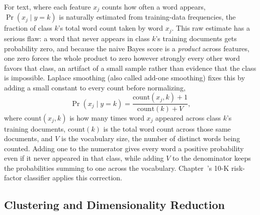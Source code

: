 \documentclass[../ai_in_finance]{subfiles}
\begin{document}
For text, where each feature $x_j$ counts how often a word appears, $\Pr(x_j \mid y=k)$ is naturally estimated from training-data frequencies, the fraction of class $k$'s total word count taken by word $x_j$. This raw estimate has a serious flaw: a word that never appears in class $k$'s training documents gets probability zero, and because the naive Bayes score is a \emph{product} across features, one zero forces the whole product to zero however strongly every other word favors that class, an artifact of a small sample rather than evidence that the class is impossible. Laplace smoothing (also called add-one smoothing) fixes this by adding a small constant to every count before normalizing,
\begin{equation*}
\Pr(x_j \mid y=k) = \frac{\text{count}(x_j, k) + 1}{\text{count}(k) + V},
\end{equation*}
where $\text{count}(x_j,k)$ is how many times word $x_j$ appeared across class $k$'s training documents, $\text{count}(k)$ is the total word count across those same documents, and $V$ is the vocabulary size, the number of distinct words being counted. Adding one to the numerator gives every word a positive probability even if it never appeared in that class, while adding $V$ to the denominator keeps the probabilities summing to one across the vocabulary. Chapter~'s 10-K risk-factor classifier applies this correction.

\subsection{Clustering and Dimensionality Reduction}
\end{document}
